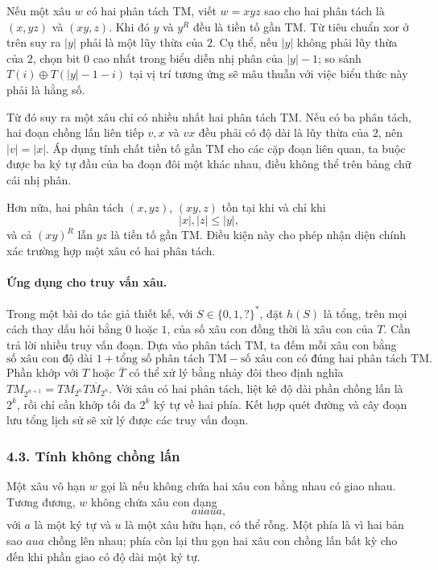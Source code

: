 \documentclass[11pt]{article}
\begin{document}
Nếu một xâu \(w\) có hai phân tách TM, viết \(w=xyz\) sao cho hai phân tách là
\((x,yz)\) và \((xy,z)\). Khi đó \(y\) và \(y^R\) đều là tiền tố gần TM. Từ tiêu
chuẩn xor ở trên suy ra \(|y|\) phải là một lũy thừa của \(2\). Cụ thể, nếu
\(|y|\) không phải lũy thừa của \(2\), chọn bit \(0\) cao nhất trong biểu diễn
nhị phân của \(|y|-1\); so sánh \(T(i)\oplus T(|y|-1-i)\) tại vị trí tương ứng
sẽ mâu thuẫn với việc biểu thức này phải là hằng số.

Từ đó suy ra một xâu chỉ có nhiều nhất hai phân tách TM. Nếu có ba phân tách,
hai đoạn chồng lấn liên tiếp \(v,x\) và \(vx\) đều phải có độ dài là lũy thừa
của \(2\), nên \(|v|=|x|\). Áp dụng tính chất tiền tố gần TM cho các cặp đoạn
liên quan, ta buộc được ba ký tự đầu của ba đoạn đôi một khác nhau, điều không
thể trên bảng chữ cái nhị phân.

Hơn nữa, hai phân tách \((x,yz)\), \((xy,z)\) tồn tại khi và chỉ khi
\[
  |x|,|z|\le |y|,
\]
và cả \((xy)^R\) lẫn \(yz\) là tiền tố gần TM. Điều kiện này cho phép nhận diện
chính xác trường hợp một xâu có hai phân tách.

\paragraph{Ứng dụng cho truy vấn xâu.}
Trong một bài do tác giả thiết kế, với \(S\in\{0,1,?\}^*\), đặt \(h(S)\) là
tổng, trên mọi cách thay dấu hỏi bằng \(0\) hoặc \(1\), của số xâu con đồng
thời là xâu con của \(T\). Cần trả lời nhiều truy vấn đoạn. Dựa vào phân tách
TM, ta đếm mỗi xâu con bằng
\[
  \text{số xâu con độ dài }1
  +\text{tổng số phân tách TM}
  -\text{số xâu con có đúng hai phân tách TM}.
\]
Phần khớp với \(T\) hoặc \(\overline T\) có thể xử lý bằng nhảy đôi theo định
nghĩa \(TM_{2^{n+1}}=TM_{2^n}\overline{TM_{2^n}}\). Với xâu có hai phân tách,
liệt kê độ dài phần chồng lấn là \(2^k\), rồi chỉ cần khớp tối đa \(2^k\) ký
tự về hai phía. Kết hợp quét đường và cây đoạn lưu tổng lịch sử sẽ xử lý được
các truy vấn đoạn.

\subsubsection*{4.3. Tính không chồng lấn}

Một xâu vô hạn \(w\) gọi là  nếu không chứa hai xâu con
bằng nhau có giao nhau. Tương đương, \(w\) không chứa xâu con dạng
\[
  auaua,
\]
với \(a\) là một ký tự và \(u\) là một xâu hữu hạn, có thể rỗng. Một phía là vì
hai bản sao \(aua\) chồng lên nhau; phía còn lại thu gọn hai xâu con chồng lấn
bất kỳ cho đến khi phần giao có độ dài một ký tự.
\end{document}
